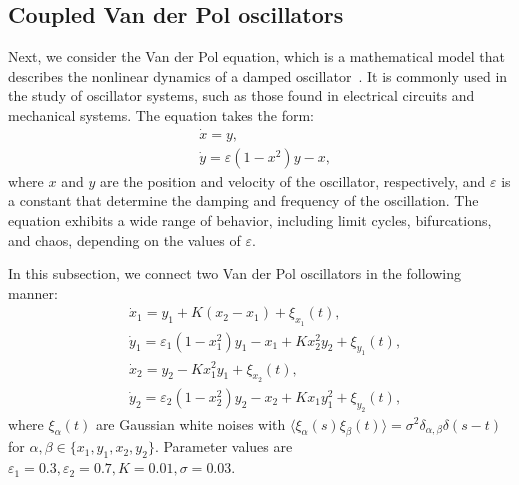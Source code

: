 \subsection{Coupled Van der Pol oscillators}
\label{subsec:vdp}
Next, we consider the Van der Pol equation, which is a mathematical model that describes the nonlinear dynamics of a damped oscillator~\cite{pol1926}. It is commonly used in the study of oscillator systems, such as those found in electrical circuits and mechanical systems. The equation takes the form:
\begin{align}
    &\dot{x}=y,\\
    &\dot{y}=\varepsilon(1-x^{2})y-x,
\end{align}
where $x$ and $y$ are the position and velocity of the oscillator, respectively,
and $\varepsilon$ is a constant that determine the damping and frequency of the oscillation. The equation exhibits a wide range of behavior, including limit cycles, bifurcations, and chaos, depending on the values of $\varepsilon$.

In this subsection, we connect two Van der Pol oscillators in the following manner:
\begin{align}
    &\dot{x}_{1}=y_{1}+K(x_{2}-x_{1})+\xi_{x_{1}}(t),\\
    &\dot{y}_{1}=\varepsilon_{1}(1-x_{1}^{2})y_{1}-x_{1}+Kx_{2}^{2}y_{2}+\xi_{y_{1}}(t),\\
    &\dot{x}_{2}=y_{2}-Kx_{1}^{2}y_{1}+\xi_{x_{2}}(t),\\
    &\dot{y}_{2}=\varepsilon_{2}(1-x_{2}^{2})y_{2}-x_{2}+Kx_{1}y_{1}^{2}+\xi_{y_{2}}(t),
\end{align}
where $\xi_{\alpha}(t)$ are Gaussian white noises with $\langle\xi_{\alpha}(s)\xi_{\beta}(t)\rangle=\sigma^{2}\delta_{\alpha,\beta}\delta(s-t)$ for $\alpha,\beta\in\{x_{1},y_{1},x_{2},y_{2}\}$.
Parameter values are $\varepsilon_{1}=0.3,\varepsilon_{2}=0.7,K=0.01,\sigma=0.03$.

